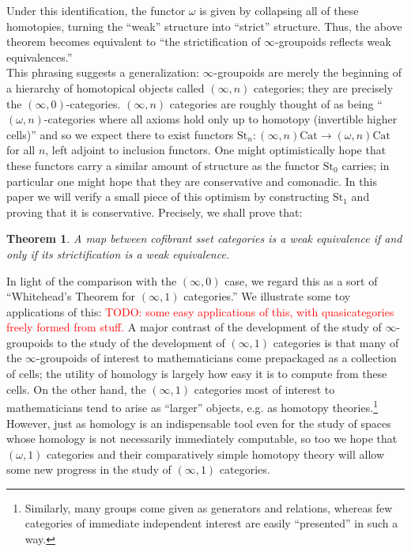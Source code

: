 \documentclass[12pt]{article}
\newtheorem{theorem}{Theorem}[section]
\theoremstyle{definition}
\newcommand{\TODO}[1]{\textcolor{red}{TODO: {#1}}}
\begin{document}
	Under this identification, the functor $\omega$ is given by collapsing all of these homotopies, turning the ``weak'' structure into ``strict'' structure. Thus, the above theorem becomes equivalent to ``the strictification of $\infty$-groupoids reflects weak equivalences.'' 
	\\
	This phrasing suggests a generalization: $\infty$-groupoids are merely the beginning of a hierarchy of homotopical objects called $(\infty,n)$ categories; they are precisely the $(\infty, 0)$-categories. $(\infty,n)$ categories are roughly thought of as being ``$(\omega,n)$-categories where all axioms hold only up to homotopy (invertible higher cells)'' and so we expect there to exist functors $\text{St}_n : (\infty,n)\text{Cat} \to (\omega,n)\text{Cat}$ for all $n$, left adjoint to inclusion functors. One might optimistically hope that these functors carry a similar amount of structure as the functor $\text{St}_0$ carries; in particular one might hope that they are conservative and comonadic. In this paper we will verify a small piece of this optimism by constructing $\text{St}_1$ and proving that it is conservative. Precisely, we shall prove that:
	\begin{theorem}
		A map between cofibrant sset categories is a weak equivalence if and only if its strictification is a weak equivalence.
	\end{theorem}	 
	In light of the comparison with the $(\infty, 0)$ case, we regard this as a sort of ``Whitehead's Theorem for $(\infty,1)$ categories.'' We illustrate some toy applications of this:
	\TODO{some easy applications of this, with quasicategories freely formed from stuff.}
	A major contrast of the development of the study of $\infty$-groupoids to the study of the development of $(\infty,1)$ categories is that many of the $\infty$-groupoids of interest to mathematicians come prepackaged as a collection of cells; the utility of homology is largely how easy it is to compute from these cells. On the other hand, the $(\infty,1)$ categories most of interest to mathematicians tend to arise as ``larger'' objects, e.g. as homotopy theories.\footnote{Similarly, many groups come given as generators and relations, whereas few categories of immediate independent interest are easily ``presented'' in such a way.} However, just as homology is an indispensable tool even for the study of spaces whose homology is not necessarily immediately computable, so too we hope that $(\omega,1)$ categories and their comparatively simple homotopy theory will allow some new progress in the study of $(\infty,1)$ categories.
\end{document}
